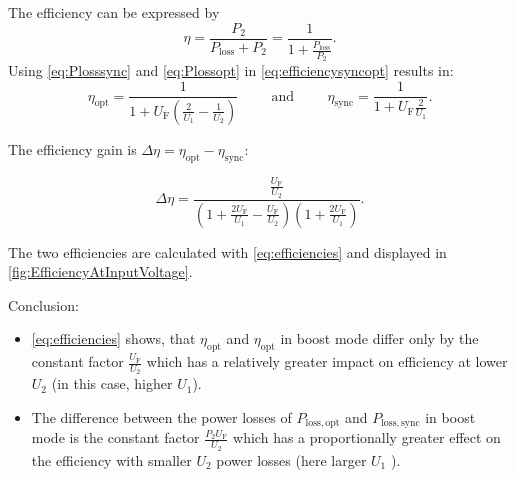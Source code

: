 \begin{solutionblock}
    The efficiency can be expressed by 
    \begin{equation}
        \eta = \frac{P_\mathrm{2}}{P_\mathrm{loss}+P_\mathrm{2}}=\frac{1}{1+\frac{P_\mathrm{loss}}{P_\mathrm{2}}}.
        \label{eq:efficiencysyncopt}
    \end{equation}
    Using \eqref{eq:Plosssync} and \eqref{eq:Plossopt} in \eqref{eq:efficiencysyncopt} results in:
    \begin{equation}
        \eta_\mathrm{opt} = \frac{1}{1+U_\mathrm{F} \left(\frac{2}{U_\mathrm{1}}-\frac{1}{U_\mathrm{2}}\right)}
        \hspace{1cm} \mathrm{and} \hspace{1cm}
        \eta_\mathrm{sync} = \frac{1}{1+U_\mathrm{F} \frac{2}{U_\mathrm{1}}}.
        \label{eq:efficiencies}
    \end{equation}

    The efficiency gain is $\Delta \eta=\eta_\mathrm{opt}-\eta_\mathrm{sync}$:
    
    \begin{equation}
        \Delta \eta= \frac{\frac{U_\mathrm{F}}{U_\mathrm{2}}}{\left(1+ \frac{2 U_\mathrm{F}}{U_\mathrm{1}}-\frac{U_\mathrm{F}}{U_\mathrm{2}} \right) \left(1+\frac{2 U_\mathrm{F}}{U_\mathrm{1}}\right)}.
        \label{eq:efficiencygain}
    \end{equation}

    The two efficiencies are calculated with \eqref{eq:efficiencies} and displayed in \autoref{fig:EfficiencyAtInputVoltage}.
    


    Conclusion: \\
    \begin{itemize}
        \item \eqref{eq:efficiencies}  shows, that $\eta_\mathrm{opt}$ and $\eta_\mathrm{opt}$ in 
        boost mode differ only by the constant factor $\frac{U_\mathrm{F}}{U_\mathrm{2}}$ which has a relatively greater impact on efficiency at lower $U_\mathrm{2}$ (in this case, higher $U_\mathrm{1}$).
        \item The difference between the power losses of $P_\mathrm{loss,opt}$ and $P_\mathrm{loss,sync}$ in boost mode is the constant factor 
        $\frac{P_\mathrm{2} U_\mathrm{F}}{U_\mathrm{2}}$
        which has a proportionally greater effect on the efficiency with smaller $U_\mathrm{2}$ power losses (here larger $U_\mathrm{1}$ ).
    \end{itemize}      

\end{solutionblock}
